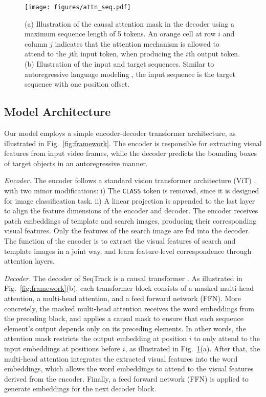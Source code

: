 \begin{figure}[t]
\begin{center}
\texttt{[image: figures/attn\_seq.pdf]}
\end{center}
\vspace{-3mm}
   \caption{(a) Illustration of the causal attention mask in the decoder using a maximum sequence length of 5 tokens. 
   An orange cell at row $i$ and column $j$ indicates that the attention mechanism is allowed to attend to the $j$th input token, when producing the $i$th output token. 
   (b) Illustration of the input and target sequences. Similar to autoregressive language modeling \cite{2017Attention}, the input sequence is the target sequence with one position offset.}
\label{fig:attn&seq}
\end{figure}

\subsection{Model Architecture}
\label{subsec:architecture}

Our model employs a simple encoder-decoder transformer architecture, as illustrated in Fig.~\ref{fig:framework}. The encoder is responsible for extracting visual features from input video frames, while the decoder predicts the bounding boxes of target objects in an autoregressive manner. 

\textit{Encoder.}
The encoder follows a standard vision transformer architecture (ViT) \cite{ViT}, with two minor modifications: i) The \texttt{CLASS} token is removed, since it is designed for image classification task.  ii) A linear projection is appended to the last layer to align the feature dimensions of the encoder and decoder.  The encoder receives patch embeddings of template and search images, producing their corresponding visual features. Only the features of the search image are fed into the decoder. The function of the encoder is to extract the visual features of search and template images in a joint way, and learn feature-level correspondence through attention layers.

\textit{Decoder.} The decoder of SeqTrack is a causal transformer \cite{2017Attention}. As illustrated in Fig.~\ref{fig:framework}(b), each transformer block consists of a masked multi-head attention, a multi-head attention, and a feed forward network (FFN). 
More concretely, the masked multi-head attention receives the word embeddings from the preceding block, and applies a causal mask to ensure that each sequence element's output depends only on its preceding elements. In other words, the attention mask restricts the output embedding at position $i$ to only attend to the input embeddings at positions before $i$, as illustrated in Fig.~\ref{fig:attn&seq}(a). After that, the multi-head attention integrates the extracted visual features into the word embeddings, which allows the word embeddings to attend to the visual features derived from the encoder. 
Finally, a feed forward network (FFN) is applied to generate embeddings for the next decoder block.


